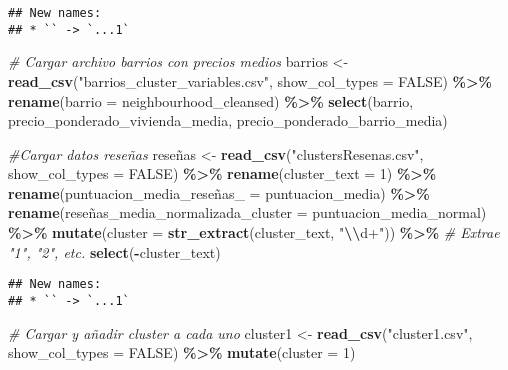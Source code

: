 \documentclass[
]{article}
\newenvironment{Shaded}{\begin{snugshade}}{\end{snugshade}}
\newcommand{\AttributeTok}[1]{\textcolor[rgb]{0.13,0.29,0.53}{#1}}
\newcommand{\CommentTok}[1]{\textcolor[rgb]{0.56,0.35,0.01}{\textit{#1}}}
\newcommand{\ConstantTok}[1]{\textcolor[rgb]{0.56,0.35,0.01}{#1}}
\newcommand{\DecValTok}[1]{\textcolor[rgb]{0.00,0.00,0.81}{#1}}
\newcommand{\FunctionTok}[1]{\textcolor[rgb]{0.13,0.29,0.53}{\textbf{#1}}}
\newcommand{\NormalTok}[1]{#1}
\newcommand{\OtherTok}[1]{\textcolor[rgb]{0.56,0.35,0.01}{#1}}
\newcommand{\SpecialCharTok}[1]{\textcolor[rgb]{0.81,0.36,0.00}{\textbf{#1}}}
\newcommand{\StringTok}[1]{\textcolor[rgb]{0.31,0.60,0.02}{#1}}
\begin{document}
\begin{verbatim}
## New names:
## * `` -> `...1`
\end{verbatim}

\begin{Shaded}
\begin{Highlighting}[]
\CommentTok{\# Cargar archivo barrios con precios medios}
\NormalTok{barrios }\OtherTok{\textless{}{-}} \FunctionTok{read\_csv}\NormalTok{(}\StringTok{"barrios\_cluster\_variables.csv"}\NormalTok{, }\AttributeTok{show\_col\_types =} \ConstantTok{FALSE}\NormalTok{) }\SpecialCharTok{\%\textgreater{}\%}
  \FunctionTok{rename}\NormalTok{(}\AttributeTok{barrio =}\NormalTok{ neighbourhood\_cleansed) }\SpecialCharTok{\%\textgreater{}\%}
  \FunctionTok{select}\NormalTok{(barrio, precio\_ponderado\_vivienda\_media, precio\_ponderado\_barrio\_media)}

  \CommentTok{\#Cargar datos reseñas}
\NormalTok{reseñas }\OtherTok{\textless{}{-}} \FunctionTok{read\_csv}\NormalTok{(}\StringTok{"clustersResenas.csv"}\NormalTok{, }\AttributeTok{show\_col\_types =} \ConstantTok{FALSE}\NormalTok{) }\SpecialCharTok{\%\textgreater{}\%}
  \FunctionTok{rename}\NormalTok{(}\AttributeTok{cluster\_text =} \DecValTok{1}\NormalTok{) }\SpecialCharTok{\%\textgreater{}\%}
  \FunctionTok{rename}\NormalTok{(puntuacion\_media\_reseñas}\AttributeTok{\_ =}\NormalTok{ puntuacion\_media) }\SpecialCharTok{\%\textgreater{}\%}
  \FunctionTok{rename}\NormalTok{(reseñas}\AttributeTok{\_media\_normalizada\_cluster =}\NormalTok{ puntuacion\_media\_normal) }\SpecialCharTok{\%\textgreater{}\%}
  \FunctionTok{mutate}\NormalTok{(}\AttributeTok{cluster =} \FunctionTok{str\_extract}\NormalTok{(cluster\_text, }\StringTok{"}\SpecialCharTok{\textbackslash{}\textbackslash{}}\StringTok{d+"}\NormalTok{)) }\SpecialCharTok{\%\textgreater{}\%}   \CommentTok{\# Extrae "1", "2", etc.}
  \FunctionTok{select}\NormalTok{(}\SpecialCharTok{{-}}\NormalTok{cluster\_text)}
\end{Highlighting}
\end{Shaded}

\begin{verbatim}
## New names:
## * `` -> `...1`
\end{verbatim}

\begin{Shaded}
\begin{Highlighting}[]
\CommentTok{\# Cargar y añadir cluster a cada uno}
\NormalTok{cluster1 }\OtherTok{\textless{}{-}} \FunctionTok{read\_csv}\NormalTok{(}\StringTok{"cluster1.csv"}\NormalTok{, }\AttributeTok{show\_col\_types =} \ConstantTok{FALSE}\NormalTok{) }\SpecialCharTok{\%\textgreater{}\%} \FunctionTok{mutate}\NormalTok{(}\AttributeTok{cluster =} \DecValTok{1}\NormalTok{)}
\end{Highlighting}
\end{Shaded}
\end{document}

